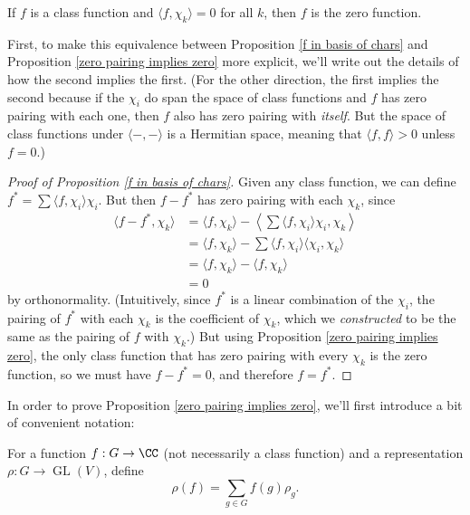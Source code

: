 \begin{proposition} \label{zero pairing implies zero}
If $f$ is a class function and $\langle f, \chi_k \rangle = 0$ for all $k$, then $f$ is the zero function. 
\end{proposition}

First, to make this equivalence between Proposition \ref{f in basis of chars} and Proposition \ref{zero pairing implies zero} more explicit, we'll write out the details of how the second implies the first. (For the other direction, the first implies the second because if the $\chi_i$ do span the space of class functions and $f$ has zero pairing with each one, then $f$ also has zero pairing with \emph{itself}. But the space of class functions under $\langle -, - \rangle$ is a Hermitian space, meaning that $\langle f, f \rangle > 0$ unless $f = 0$.)

\begin{proof}[Proof of Proposition \ref{f in basis of chars}] 
Given any class function, we can define $f^* = \sum \langle f, \chi_i \rangle \chi_i$. But then $f - f^*$ has zero pairing with each $\chi_k$, since 
\begin{align*}
    \langle f - f^*, \chi_k \rangle &= \langle f, \chi_k \rangle - \left\langle \sum \langle f, \chi_i \rangle \chi_i, \chi_k \right\rangle \\
    &= \langle f, \chi_k \rangle - \sum \langle f, \chi_i\rangle \langle \chi_i, \chi_k\rangle \\
    &= \langle f, \chi_k \rangle - \langle f, \chi_k \rangle \\
    &= 0
\end{align*}
by orthonormality. (Intuitively, since $f^*$ is a linear combination of the $\chi_i$, the pairing of $f^*$ with each $\chi_k$ is the coefficient of $\chi_k$, which we \emph{constructed} to be the same as the pairing of $f$ with $\chi_k$.) But using Proposition \ref{zero pairing implies zero}, the only class function that has zero pairing with every $\chi_k$ is the zero function, so we must have $f - f^* = 0$, and therefore $f = f^*$. 
\end{proof}

In order to prove Proposition \ref{zero pairing implies zero}, we'll first introduce a bit of convenient notation:

\begin{definition}
    For a function $f : G \to \CC$ (not necessarily a class function) and a representation $\rho : G \to \operatorname{GL}(V)$, define \[\rho(f) = \sum_{g \in G} f(g)\rho_g.\] 
\end{definition}


